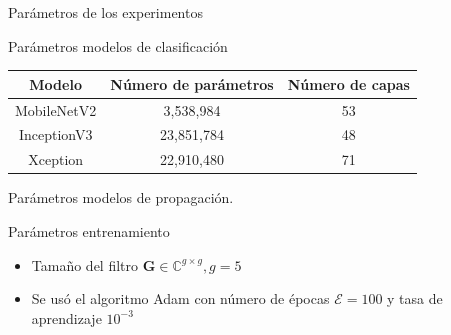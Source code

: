 \documentclass[aspectratio=169,t,xcolor=table]{beamer}
\begin{document}
\begin{frame}{Parámetros de los experimentos}
\scriptsize
\vspace{-1cm}
\begin{block}{\scriptsize Parámetros modelos de clasificación}
    
    \begin{table}[!h]
    \centering
    \begin{tabular}{|c|c|c|}
    \hline
    \textbf{Modelo}      & \textbf{Número de parámetros} & \textbf{Número de capas} \\ \hline
    MobileNetV2 & 3,538,984            & 53              \\ \hline
    InceptionV3 & 23,851,784           & 48              \\ \hline
    Xception    & 22,910,480           & 71              \\ \hline
    \end{tabular}
    
    \end{table}
\end{block}
\vspace{-0.5cm}
\begin{block}{\scriptsize Parámetros modelos de propagación.}
\begin{table}[!h]
\centering
\renewcommand*{\arraystretch}{1.1}

\end{table}
\end{block}
\vspace{-0.5cm}
\begin{block}{\scriptsize Parámetros entrenamiento}
\scriptsize
\begin{itemize}
    \item Tamaño del filtro $\mathbf{G} \in \mathbb{C}^{g\times g}, g = 5$
    \item Se usó el algoritmo Adam con número de épocas $\mathcal{E}=100$ y tasa de aprendizaje $10^{-3}$
\end{itemize}   
\end{block}
\end{frame}
\end{document}
